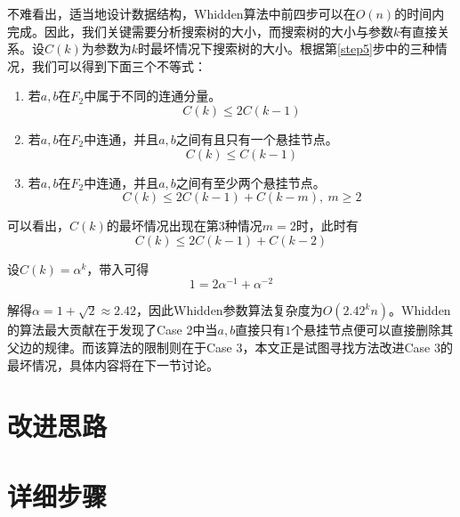 不难看出，适当地设计数据结构，Whidden算法中前四步可以在$O(n)$的时间内完成。因此，我们关键需要分析搜索树的大小，而搜索树的大小与参数$k$有直接关系。设$C(k)$为参数为$k$时最坏情况下搜索树的大小。根据第\ref{step5}步中的三种情况，我们可以得到下面三个不等式：
\begin{enumerate}
	\item 若$a,b$在$F_2$中属于不同的连通分量。
	\begin{equation*}
		C(k) \le 2C(k-1)
	\end{equation*}
	\item 若$a,b$在$F_2$中连通，并且$a,b$之间有且只有一个悬挂节点。
	\begin{equation*}
		C(k) \le C(k-1)
	\end{equation*}
	\item \label{case3_an}若$a,b$在$F_2$中连通，并且$a,b$之间有至少两个悬挂节点。
	\begin{equation*}
		C(k) \le 2C(k-1) + C(k-m),~m \ge 2
	\end{equation*}
\end{enumerate}

可以看出，$C(k)$的最坏情况出现在第3种情况$m = 2$时，此时有
\begin{equation*}
C(k) \le 2C(k-1) + C(k-2)
\end{equation*}

设$C(k)=\alpha ^ k$，带入可得
\begin{equation*}
 1 = 2 \alpha ^ {-1} + \alpha ^ {-2}
\end{equation*}

解得$\alpha = 1 + \sqrt{2} \approx 2.42$，因此Whidden参数算法复杂度为$O(2.42^kn)$。Whidden的算法最大贡献在于发现了Case 2中当$a,b$直接只有$1$个悬挂节点便可以直接删除其父边的规律。而该算法的限制则在于Case 3，本文正是试图寻找方法改进Case 3的最坏情况，具体内容将在下一节讨论。

\section{改进思路}

\section{详细步骤}


































